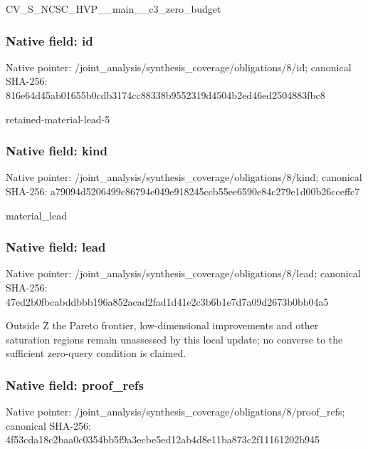 \documentclass[10pt,a4paper]{article}
\begin{document}
\begingroup\raggedright\sloppy CV\_\allowbreak{}S\_\allowbreak{}NCSC\_\allowbreak{}HVP\_\allowbreak{}\_\allowbreak{}main\_\allowbreak{}\_\allowbreak{}c3\_\allowbreak{}zero\_\allowbreak{}budget\par\endgroup

\subsubsection{Native field: id}
Native pointer: /joint\_\allowbreak{}analysis/synthesis\_\allowbreak{}coverage/obligations/8/id; canonical SHA-256: 816e64d45ab01655b0cdb3174cc88338b9552319d4504b2ed46ed2504883fbc8

\begingroup\raggedright\sloppy retained-material-lead-5\par\endgroup

\subsubsection{Native field: kind}
Native pointer: /joint\_\allowbreak{}analysis/synthesis\_\allowbreak{}coverage/obligations/8/kind; canonical SHA-256: a79094d5206499c86794e049e918245ccb55ee6590e84c279e1d00b26cceffc7

\begingroup\raggedright\sloppy material\_\allowbreak{}lead\par\endgroup

\subsubsection{Native field: lead}
Native pointer: /joint\_\allowbreak{}analysis/synthesis\_\allowbreak{}coverage/obligations/8/lead; canonical SHA-256: 47ed2b0fbcabddbbb196a852acad2fad1d41e2c3b6b1e7d7a09d2673b0bb04a5

\begingroup\raggedright\sloppy Outside Z the Pareto frontier,\allowbreak{} low-dimensional improvements and other saturation regions remain unassessed by this local update;\allowbreak{} no converse to the sufficient zero-query condition is claimed.\par\endgroup

\subsubsection{Native field: proof\_\allowbreak{}refs}
Native pointer: /joint\_\allowbreak{}analysis/synthesis\_\allowbreak{}coverage/obligations/8/proof\_\allowbreak{}refs; canonical SHA-256: 4f53cda18c2baa0c0354bb5f9a3ecbe5ed12ab4d8e11ba873c2f11161202b945
\end{document}
